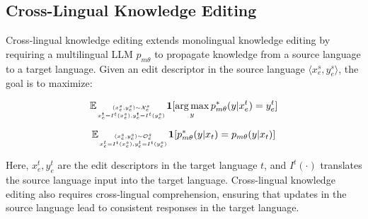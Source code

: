 \subsection{Cross-Lingual Knowledge Editing}
Cross-lingual knowledge editing extends monolingual knowledge editing by requiring a multilingual LLM $p_{m\theta}$ to propagate knowledge from a source language to a target language. Given an edit descriptor in the source language $\langle x_e^s, y_e^s \rangle$, the goal is to maximize:

\begin{equation}
\mathbb{E}_{(x_e^s, y_e^s) \sim \mathcal{X}_e^s
\atop
x_e^t = I^t({x}^s_e), y_e^t = I^t({y}^s_e)
}\mathbf{1}[\mathop{\arg\max}_{y} p_{m\theta}^*(y|x_e^t) = y_e^t]
\end{equation}

\begin{equation}
\mathbb{E}_{(x_e^s, y_e^s) \sim \mathcal{O}_e^s
\atop
x_e^t = I^t({x}^s_e), y_e^t = I^t({y}^s_e)
}\mathbf{1}[p_{m\theta}^*(y|x_t) = p_{m\theta}(y|x_t)]
\end{equation}

Here, $x_e^t, y_e^t$ are the edit descriptors in the target language $t$, and $I^t(\cdot)$ translates the source language input into the target language. Cross-lingual knowledge editing also requires cross-lingual comprehension, ensuring that updates in the source language lead to consistent responses in the target language.